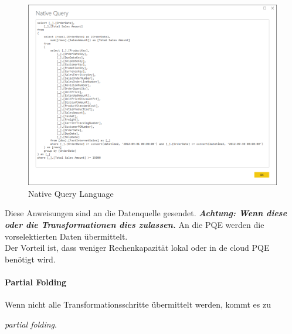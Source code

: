 	\begin{figure}[H]
	\centering
	\includegraphics[scale = 0.3]{attachment/chapter_1/Scc167}
	\caption{Native Query Language}
\end{figure}
Diese Anweisungen sind an die Datenquelle gesendet. \textbf{\textit{Achtung: Wenn diese oder die Transformationen dies zulassen.}}
An die \gls{PQE} werden die vorselektierten Daten übermittelt. \\

Der Vorteil ist, dass weniger Rechenkapazität lokal oder in de cloud \gls{PQE} benötigt wird.

\paragraph{Partial Folding}
Wenn nicht alle Transformationsschritte übermittelt werden, kommt es zu
\begin{center}
	\textit{partial folding}.
\end{center}


